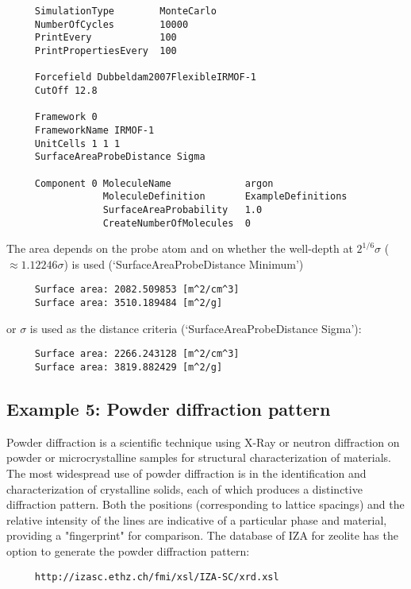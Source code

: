 \begin{tiny}
\begin{verbatim}
     SimulationType        MonteCarlo
     NumberOfCycles        10000
     PrintEvery            100
     PrintPropertiesEvery  100

     Forcefield Dubbeldam2007FlexibleIRMOF-1
     CutOff 12.8

     Framework 0
     FrameworkName IRMOF-1
     UnitCells 1 1 1
     SurfaceAreaProbeDistance Sigma

     Component 0 MoleculeName             argon
                 MoleculeDefinition       ExampleDefinitions
                 SurfaceAreaProbability   1.0
                 CreateNumberOfMolecules  0
\end{verbatim}
\end{tiny}
The area depends on the probe atom and on whether the well-depth at $2^{1/6}\sigma$ ($\approx 1.12246\sigma$)
is used (`SurfaceAreaProbeDistance Minimum')
\begin{tiny}
\begin{verbatim}
     Surface area: 2082.509853 [m^2/cm^3]
     Surface area: 3510.189484 [m^2/g]
\end{verbatim}
\end{tiny}
or $\sigma$ is used as the distance criteria (`SurfaceAreaProbeDistance Sigma'):
\begin{tiny}
\begin{verbatim}
     Surface area: 2266.243128 [m^2/cm^3]
     Surface area: 3819.882429 [m^2/g]
\end{verbatim}
\end{tiny}


\subsection*{Example 5: Powder diffraction pattern}

Powder diffraction is a scientific technique using X-Ray or neutron diffraction on powder or microcrystalline samples
for structural characterization of materials.
The most widespread use of powder diffraction is in the identification and characterization of crystalline solids,
each of which produces a distinctive diffraction pattern. Both the positions (corresponding to lattice spacings) and
the relative intensity of the lines are indicative of a particular phase and material, providing a "fingerprint" for comparison.
The database of IZA for zeolite has the option to generate the powder diffraction pattern:
\begin{tiny}
\begin{verbatim}
     http://izasc.ethz.ch/fmi/xsl/IZA-SC/xrd.xsl
\end{verbatim}
\end{tiny}

